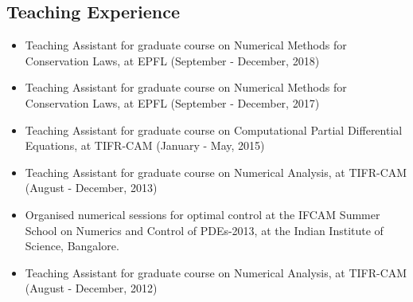 \documentclass[margin]{res}
\begin{document}
\begin{resume}
%               
%
%
%               
%
%               
%
            
              
\section{Teaching Experience} 
   
               \begin{itemize} \itemsep -2pt
               \item Teaching Assistant for graduate course on Numerical Methods for Conservation Laws, at EPFL (September - December, 2018)
                \item Teaching Assistant for graduate course on Numerical Methods for Conservation Laws, at EPFL (September - December, 2017)
               \item Teaching Assistant for graduate course on Computational Partial Differential Equations, at TIFR-CAM (January - May, 2015)
               \item Teaching Assistant for graduate course on Numerical Analysis, at TIFR-CAM  (August - December, 2013)
               \item Organised numerical sessions for optimal control at the IFCAM Summer School on Numerics and Control of PDEs-2013, at the Indian Institute of Science, Bangalore. 
               \item Teaching Assistant for graduate course on Numerical Analysis, at TIFR-CAM   (August - December, 2012)
               \end{itemize}          
               

\end{resume}
\end{document}
